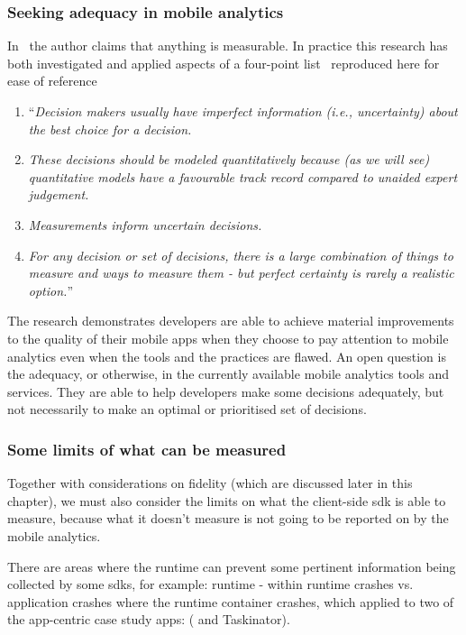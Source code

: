 \subsubsection{Seeking adequacy in mobile analytics}
In~ the author claims that anything is measurable. In practice this research has both investigated and applied aspects of a four-point list~ reproduced here for ease of reference %

\begin{enumerate}
    \itemsep0em
    \item ``\emph{Decision makers usually have imperfect information (i.e., uncertainty) about the best choice for a decision.}
    \item \emph{These decisions should be modeled quantitatively because (as we will see) quantitative models have a favourable track record compared to unaided expert judgement.}
    \item \emph{Measurements inform uncertain decisions.}
    \item \emph{For any decision or set of decisions, there is a large combination of things to measure and ways to measure them - but perfect certainty is rarely a realistic option.}''
\end{enumerate}

The research demonstrates developers are able to achieve material improvements to the quality of their mobile apps when they choose to pay attention to mobile analytics even when the tools and the practices are flawed. An open question is the adequacy, or otherwise, in the currently available mobile analytics tools and services. They are able to help developers make some decisions adequately, but not necessarily to make an optimal or prioritised set of decisions. 

\subsubsection{Some limits of what can be measured}
Together with considerations on fidelity (which are discussed later in this chapter), we must also consider the limits on what the client-side \Gls{sdk} is able to measure, because what it doesn't measure is not going to be reported on by the mobile analytics. 

There are areas where the runtime can prevent some pertinent information being collected by some \Glspl{sdk}, for example:  runtime - within runtime crashes vs. application crashes where the runtime container crashes, which applied to two of the app-centric case study apps: ( and Taskinator).

